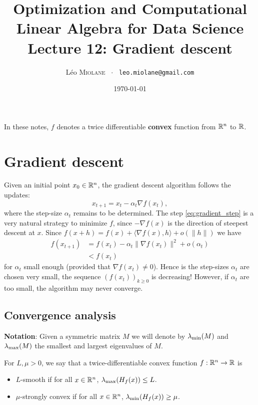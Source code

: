 \documentclass[11pt,nocut]{article}
\title{\vspace{-2.0cm}%
	Optimization and Computational Linear Algebra for Data Science\\
Lecture 12: Gradient descent}
\author{Léo \textsc{Miolane} \ $\cdot$ \ \texttt{leo.miolane@gmail.com}}
\date{\today}
\begin{document}
\maketitle


\begin{center}
In these notes, $f$ denotes a twice differentiable \textbf{convex} function from $\mathbb{R}^n$ to $\mathbb{R}$.
\end{center}

\section{Gradient descent}

Given an initial point $x_0 \in \mathbb{R}^n$, the gradient descent algorithm follows the updates:
\begin{equation}\label{eq:gradient_step}
x_{t+1} = x_t - \alpha_t \nabla f(x_t),
\end{equation}
where the step-size $\alpha_t$ remains to be determined.
The step \eqref{eq:gradient_step} is a very natural strategy to minimize $f$, since $-\nabla f(x)$ is the direction of steepest descent at $x$. Since $f(x+h) = f(x) + \langle \nabla f(x), h \rangle + o(\|h\|)$ we have
\begin{align*}
f(x_{t+1}) 
&= f(x_t) - \alpha_t \| \nabla f(x_t) \|^2 + o(\alpha_t) \\
&< f(x_t) 
\end{align*}
for $\alpha_t$ small enough (provided that $\nabla f(x_t) \neq 0$).
Hence is the step-sizes $\alpha_t$ are chosen very small, the sequence $(f(x_t))_{k \geq 0}$ is decreasing!
However, if $\alpha_t$ are too small, the algorithm may never converge.

\subsection{Convergence analysis}

\textbf{Notation}: Given a symmetric matrix $M$ we will denote by $\lambda_{\rm min}(M)$ and $\lambda_{\rm max}(M)$ the smallest and largest eigenvalues of $M$. 
\begin{definition}
	For $L,\mu >0$, we say that a twice-differentiable convex function $f: \mathbb{R}^n \to \mathbb{R}$ is
	\begin{itemize}
		\item $L$-smooth if for all $x \in \mathbb{R}^n$, $\lambda_{\rm max}(H_f(x)) \leq L$.
		\item $\mu$-strongly convex if for all $x \in \mathbb{R}^n$, $\lambda_{\rm min}(H_f(x)) \geq \mu$.
	\end{itemize}
\end{definition}
\end{document}
